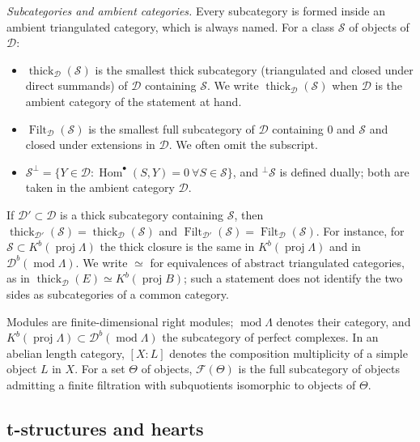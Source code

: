 \documentclass[11pt,reqno]{amsart}
\theoremstyle{plain}
\theoremstyle{definition}
\theoremstyle{remark}
\DeclareMathOperator{\Hom}{Hom}
\DeclareMathOperator{\Filt}{Filt}
\newcommand{\modd}{\operatorname{mod}}
\newcommand{\proj}{\operatorname{proj}}
\newcommand{\Db}{\mathcal{D}^b}
\newcommand{\Kb}{K^b}
\newcommand{\thick}[2][\cD]{\operatorname{thick}_{#1}(#2)}
\newcommand{\cD}{\mathcal{D}}
\newcommand{\cF}{\mathcal{F}}
\begin{document}
\emph{Subcategories and ambient categories.} Every subcategory is formed inside an ambient triangulated category, which is always named. For a class $\mathcal S$ of objects of $\cD$:
\begin{itemize}
\item $\thick[\cD]{\mathcal S}$ is the smallest thick subcategory (triangulated and closed under direct summands) of $\cD$ containing $\mathcal S$. We write $\thick{\mathcal S}$ when $\cD$ is the ambient category of the statement at hand.
\item $\Filt_\cD(\mathcal S)$ is the smallest full subcategory of $\cD$ containing $0$ and $\mathcal S$ and closed under extensions in $\cD$. We often omit the subscript.
\item $\mathcal S^\perp=\{Y\in\cD:\Hom^\bullet(S,Y)=0\ \forall S\in\mathcal S\}$, and ${}^\perp\mathcal S$ is defined dually; both are taken in the ambient category $\cD$.
\end{itemize}
If $\cD'\subset\cD$ is a thick subcategory containing $\mathcal S$, then $\thick[\cD']{\mathcal S}=\thick[\cD]{\mathcal S}$ and $\Filt_{\cD'}(\mathcal S)=\Filt_\cD(\mathcal S)$. For instance, for $\mathcal S\subset\Kb(\proj\Lambda)$ the thick closure is the same in $\Kb(\proj\Lambda)$ and in $\Db(\modd\Lambda)$. We write $\simeq$ for equivalences of abstract triangulated categories, as in $\thick[\cD]{E}\simeq\Kb(\proj B)$; such a statement does not identify the two sides as subcategories of a common category.

Modules are finite-dimensional right modules; $\modd\Lambda$ denotes their category, and $\Kb(\proj\Lambda)\subset\Db(\modd\Lambda)$ the subcategory of perfect complexes. In an abelian length category, $[X:L]$ denotes the composition multiplicity of a simple object $L$ in $X$. For a set $\Theta$ of objects, $\cF(\Theta)$ is the full subcategory of objects admitting a finite filtration with subquotients isomorphic to objects of $\Theta$.

\subsection{t-structures and hearts}
\end{document}
